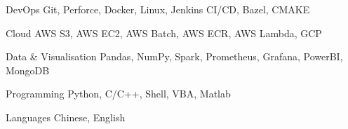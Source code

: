 

\begin{cvskills}

  \cvskill
    {DevOps} %
    {Git, Perforce, Docker, Linux, Jenkins CI/CD, Bazel, CMAKE} %

  \cvskill
    {Cloud} %
    {AWS S3, AWS EC2, AWS Batch, AWS ECR, AWS Lambda, GCP} %

  \cvskill
    {Data & Visualisation} %
    {Pandas, NumPy, Spark, Prometheus, Grafana, PowerBI, MongoDB} %

  \cvskill
    {Programming} %
    {Python, C/C++, Shell, VBA, Matlab} %

  \cvskill
    {Languages} %
    {Chinese, English} %

\end{cvskills}

